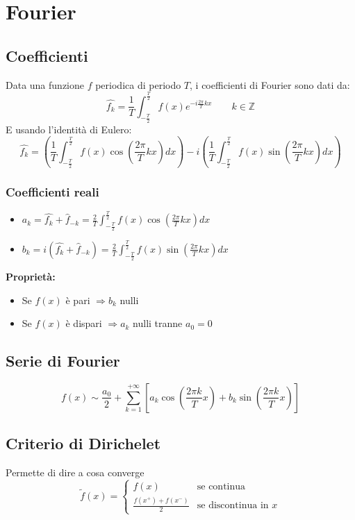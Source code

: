 \documentclass[10pt, a4paper]{article}
\begin{document}
\section{Fourier}
    \subsection{Coefficienti}
        Data una funzione $f$ periodica di periodo $T$, i coefficienti di Fourier sono dati da:
        \begin{equation*}
            \hat{f_k}=\frac{1}{T}\int_{-\frac{T}{2}}^{\frac{T}{2}}f(x)e^{-i\frac{2\pi}{T}kx} \qquad k\in\mathbb{Z}
        \end{equation*}
        E usando l'identità di Eulero:
        \begin{equation*}
            \hat{f_k}=\left(\frac{1}{T}\int_{-\frac{T}{2}}^{\frac{T}{2}}f(x)\cos\left(\frac{2\pi}{T}kx\right)dx\right)-i\left(\frac{1}{T}\int_{-\frac{T}{2}}^{\frac{T}{2}}f(x)\sin\left(\frac{2\pi}{T}kx\right)dx\right)
        \end{equation*}
        \subsubsection{Coefficienti reali}
        \begin{itemize}
            \item $a_k=\hat{f_k}+\hat{f}_{-k}=\frac{2}{T}\int_{-\frac{T}{2}}^{\frac{T}{2}}f(x)\cos\left(\frac{2\pi}{T}kx\right)dx$
            \item $b_k=i(\hat{f_k}+\hat{f}_{-k})=\frac{2}{T}\int_{-\frac{T}{2}}^{\frac{T}{2}}f(x)\sin\left(\frac{2\pi}{T}kx\right)dx$
        \end{itemize}
        \textbf{Proprietà:} \begin{itemize}
            \item Se $f(x)$ è pari $\Rightarrow b_k$ nulli
            \item Se $f(x)$ è dispari $\Rightarrow a_k$ nulli tranne $a_0=0$
        \end{itemize}
    \subsection{Serie di Fourier}
        \begin{equation*}
            f(x)\sim \frac{a_0}{2}+\sum_{k=1}^{+\infty}\left[a_k\cos\left(\frac{2\pi k}{T}x\right)+b_k\sin\left(\frac{2\pi k}{T}x\right)\right]
        \end{equation*}
    \subsection{Criterio di Dirichelet}
        Permette di dire a cosa converge
        $$
        \tilde{f}(x)=\begin{cases}
            f(x) & \text{se continua}\\
            \frac{f(x^+)+f(x^-)}{2} & \text{se discontinua in } x
        \end{cases}
        $$
\end{document}
